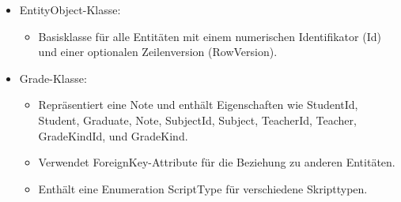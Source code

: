 \begin{itemize}
    \item EntityObject-Klasse:
    \begin{itemize}
        \item Basisklasse für alle Entitäten mit einem numerischen Identifikator (Id) und einer optionalen Zeilenversion (RowVersion).
    \end{itemize}
    \item Grade-Klasse:
    \begin{itemize}
        \item Repräsentiert eine Note und enthält Eigenschaften wie StudentId, Student, Graduate, Note, SubjectId, Subject, TeacherId, Teacher, GradeKindId, und GradeKind.
        \item Verwendet ForeignKey-Attribute für die Beziehung zu anderen Entitäten.
        \item Enthält eine Enumeration ScriptType für verschiedene Skripttypen.
        

\end{itemize}
\end{itemize}
